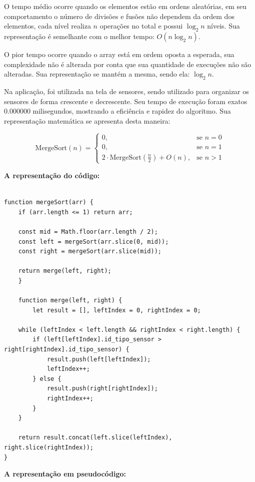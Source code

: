 \documentclass[
  a4paper,
  12pt,
  english,
  brazilian,
]{article}
\begin{document}
O tempo médio ocorre quando os elementos estão em ordens aleatórias, em seu comportamento o número de divisões e fusões não dependem da ordem dos elementos, cada nível realiza \( n \) operações no total e possui \( \log_2 n \) níveis. Sua representação é semelhante com o melhor tempo: \( O(n \log_2 n) \).

O pior tempo ocorre quando o array está em ordem oposta a esperada, sua complexidade não é alterada por conta que sua quantidade de execuções não são alteradas. Sua representação se mantém a mesma, sendo ela: \( \log_2 n \).

Na aplicação, foi utilizada na tela de sensores, sendo utilizado para organizar os sensores de forma crescente e decrescente. Seu tempo de execução foram exatos 0.000000 milisegundos, mostrando a eficiência e rapidez do algoritmo. Sua representação matemática se apresenta desta maneira:

\[
\text{MergeSort}(n) =
\begin{cases}
0, & \text{se } n = 0 \\
0, & \text{se } n = 1 \\
2 \cdot \text{MergeSort}\left(\frac{n}{2}\right) + O(n), & \text{se } n > 1
\end{cases}
\]

\textbf {A representação do código:} 

\begin{verbatim}
    
function mergeSort(arr) {
    if (arr.length <= 1) return arr;

    const mid = Math.floor(arr.length / 2);
    const left = mergeSort(arr.slice(0, mid));
    const right = mergeSort(arr.slice(mid));

    return merge(left, right);
    }

    function merge(left, right) {
        let result = [], leftIndex = 0, rightIndex = 0;

    while (leftIndex < left.length && rightIndex < right.length) {
        if (left[leftIndex].id_tipo_sensor > right[rightIndex].id_tipo_sensor) {
            result.push(left[leftIndex]);
            leftIndex++;
        } else {
            result.push(right[rightIndex]);
            rightIndex++;
        }
    }

    return result.concat(left.slice(leftIndex), right.slice(rightIndex));
}

\end{verbatim}

\textbf {A representação em pseudocódigo:} 
\end{document}
